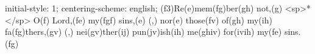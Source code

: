 initial-style: 1;
centering-scheme: english;
(f3)Re(e)mem(fg)ber(gh) not,(g) <sp>*</sp> O(f) Lord,(fe) my(fgf) sins,(e) (,) nor(e) those(fv) of(gh) my(ih) fa(fg)thers,(gv) (,) nei(gv)ther(ij) pun(jv)ish(ih) me(ghiv) for(ivih) my(fe) sins.(fg)

